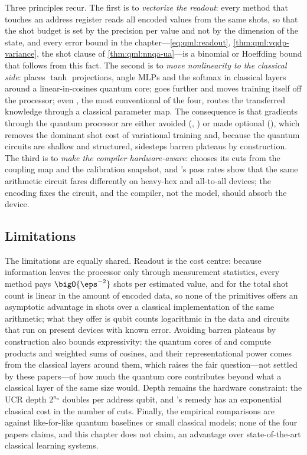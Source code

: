 Three principles recur. The first is to \emph{vectorize the readout}: every method that touches an address register reads all encoded values from the same shots, so that the shot budget is set by the precision per value and not by the dimension of the state, and every error bound in the chapter---\cref{eq:qml:readout}, \cref{thm:qml:vqdp-variance}, the shot clause of \cref{thm:qml:nnqa-ua}---is a binomial or Hoeffding bound that follows from this fact. The second is to \emph{move nonlinearity to the classical side}: \vqt{} places $\tanh$ projections, angle MLPs and the softmax in classical layers around a linear-in-cosines quantum core; \nnqa{} goes further and moves training itself off the processor; even \qpie{}, the most conventional of the four, routes the transferred knowledge through a classical parameter map. The consequence is that gradients through the quantum processor are either avoided (\vqt{}, \nnqa{}) or made optional (\qpie{}), which removes the dominant shot cost of variational training and, because the quantum circuits are shallow and structured, sidesteps barren plateaus by construction. The third is to \emph{make the compiler hardware-aware}: \shardq{} chooses its cuts from the coupling map and the calibration snapshot, and \nnqa{}'s pass rates show that the same arithmetic circuit fares differently on heavy-hex and all-to-all devices; the encoding fixes the circuit, and the compiler, not the model, should absorb the device.

\subsection{Limitations}\label{sec:qml:synthesis:limitations}

The limitations are equally shared. Readout is the cost centre: because information leaves the processor only through measurement statistics, every method pays $\bigO{\eps^{-2}}$ shots per estimated value, and for \vqt{} the total shot count is linear in the amount of encoded data, so none of the primitives offers an asymptotic advantage in shots over a classical implementation of the same arithmetic; what they offer is qubit counts logarithmic in the data and circuits that run on present devices with known error. Avoiding barren plateaus by construction also bounds expressivity: the quantum cores of \vqt{} and \nnqa{} compute products and weighted sums of cosines, and their representational power comes from the classical layers around them, which raises the fair question---not settled by these papers---of how much the quantum core contributes beyond what a classical layer of the same size would. Depth remains the hardware constraint: the UCR depth $2^{n_a}$ doubles per address qubit, and \shardq{}'s remedy has an exponential classical cost in the number of cuts. Finally, the empirical comparisons are against like-for-like quantum baselines or small classical models; none of the four papers claims, and this chapter does not claim, an advantage over state-of-the-art classical learning systems.


